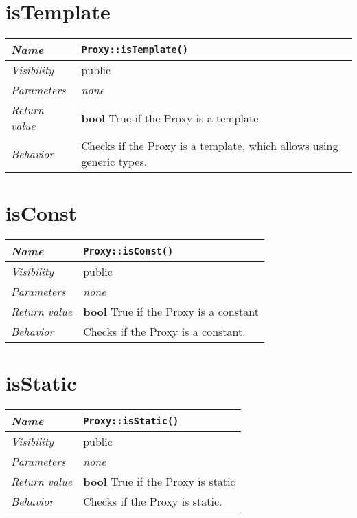  \section{isTemplate}
\begin{longtable}{p{3cm} @{\hskip 1cm} p{12cm}}
 \hline
\textit{Name} & \texttt{Proxy::isTemplate()}\\
\hline
 \textit{Visibility} & public\\
\hline
\textit{Parameters} & \textit{none}\\
\hline
\textit{Return value} & \textbf{ bool} True if the Proxy is a template \\
  \hline
 \textit{Behavior} & Checks if the Proxy is a template, which allows using generic types. \\
\hline
\end{longtable} \pagebreak
 \section{isConst}
\begin{longtable}{p{3cm} @{\hskip 1cm} p{12cm}}
 \hline
\textit{Name} & \texttt{Proxy::isConst()}\\
\hline
 \textit{Visibility} & public\\
\hline
\textit{Parameters} & \textit{none}\\
\hline
\textit{Return value} & \textbf{ bool} True if the Proxy is a constant \\
  \hline
 \textit{Behavior} & Checks if the Proxy is a constant. \\
\hline
\end{longtable} \pagebreak
 \section{isStatic}
\begin{longtable}{p{3cm} @{\hskip 1cm} p{12cm}}
 \hline
\textit{Name} & \texttt{Proxy::isStatic()}\\
\hline
 \textit{Visibility} & public\\
\hline
\textit{Parameters} & \textit{none}\\
\hline
\textit{Return value} & \textbf{ bool} True if the Proxy is static \\
  \hline
 \textit{Behavior} & Checks if the Proxy is static. \\
\hline
\end{longtable} \pagebreak
